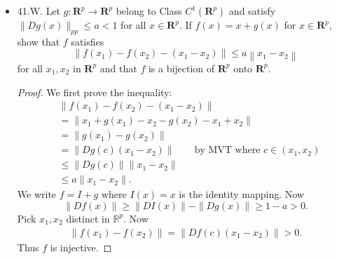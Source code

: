 \begin{itemize}
\begin{proof}
	Next we suppose inductively that $x_0, x_1, \ldots, x_n$ have been chosen in $\mathbb{R}^p$ such that for $k = 1,\ldots, n$,
	\[
		\|x_k - x_{k-1}\|\le  \alpha / 2^k \qquad 
		\|x_k - x_0\|\le (1 - \frac{1}{2^k})\alpha
	.\] 
	We now define $x_{n+1}$ by
	\[
		x_{n+1} = x_n - M (L_1 - L) (x_n - x_{n-1})  
	.\] 
	It follows that
	\[
		\|x_{n+1} - x_n\| \le  m \|L_1 - L\| \|x_n - x_{n-1 }\| \le \frac{1}{2} \|x_n - x_{n-1}\| \le \alpha / 2^{k+1}
	.\] 
	We also have
	\[
		\|x_{n+1} - x_0\|\le \|x_{n+1} - x_n\| + \|x_n - x_0\| \le  \frac{\alpha}{2^{n+1 }} + (1-\frac{1}{2^n} \alpha) = (1 - \frac{1}{2^{n+1}}) \alpha
	.\] 
	This completes the induction, so we can construct a sequence $(x_n)$ in $\mathbb{R}^p$. Then  $(x_n)$ is Cauchy, same as the proof of 41.6. Then $x_n$ converges to some element $x \in \mathbb{R}^p$. Now
	\[
		L(x_1 - x_0) = L M (y - L_1 x_0) = (L - L_1) x_0
	\] 
	and
	\[
	L(x_{n+1} -  x_{n}) = - L M (L_1 - L)(x_n - x_{n-1}) = (L - L_1)(x_n - x_{n-1})
	.\] 
	Thus
	\[
		L(x_{n+1} - x_n) = (L - L_1)x_n
	\] 
	Thus
	\[
		L_1 \left( x_n \right)  = L (x_n) - L(x_{n+1} - x_n) \to L(x)  = y
	.\] 
	But $L_1$ is linear, so $L_1(x_n) \to  L_1(x)$. Thus $L_1(x) = y$. Since $y$ is arbitrary, $L_1$ is surjective.
\end{proof}

\item 41.W. Let $g: \mathbf{R}^p \rightarrow \mathbf{R}^p$ belong to Class $C^1\left(\boldsymbol{R}^p\right)$ and satisfy $\|D g(x)\|_{p p} \leq a<1$ for all $x \in \mathbf{R}^p$. If $f(x)=x+g(x)$ for $x \in \mathbf{R}^p$, show that $f$ satisfies
\[
\left\|f\left(x_1\right)-f\left(x_2\right)-\left(x_1-x_2\right)\right\| \leq a\left\|x_1-x_2\right\|
\]
for all $x_1, x_2$ in $\mathbf{R}^p$ and that $f$ is a bijection of $\boldsymbol{R}^p$ onto $\mathbf{R}^p$.
\begin{proof}
	We first prove the inequality:
	\begin{align*}
		&\|f(x_1) - f(x_2) - (x_1-x_2)\|\\
		&= \|x_1 + g(x_1) - x_2 - g(x_2) - x_1 + x_2\| \\
		&= \|g(x_1) - g(x_2)\| \\
		&= \|Dg(c) (x_1 - x_2)\|\qquad \text{by MVT where $c \in (x_1, x_2)$} \\
		&\le \|Dg\left( c \right) \|\|x_1 - x_2\|\\
		&\le a \|x_1 -x_2\|
	.\end{align*}
	We write $f = I + g$ where $I(x) = x$ is the identity mapping. Now
	\[
		\|Df(x)\| \ge \|DI(x)\|-\|Dg(x)\| \ge  1 - a > 0 
	.\] 
	Pick $x_1, x_2$ distinct in $\mathbb{R}^p$. Now
	\begin{align*}
		\|f(x_1) - f(x_2)\| = \|Df(c) (x_1 - x_2)\| > 0
	.\end{align*}
	Thus $f$ is injective.


\end{proof}
\end{itemize}
